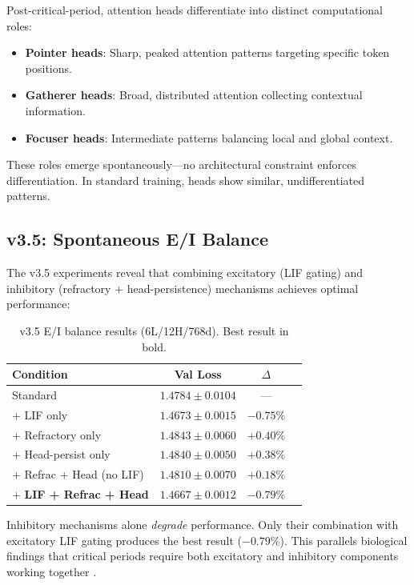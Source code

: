 \documentclass[11pt]{article}
\begin{document}
Post-critical-period, attention heads differentiate into distinct computational roles:
\begin{itemize}
    \item \textbf{Pointer heads}: Sharp, peaked attention patterns targeting specific token positions.
    \item \textbf{Gatherer heads}: Broad, distributed attention collecting contextual information.
    \item \textbf{Focuser heads}: Intermediate patterns balancing local and global context.
\end{itemize}

These roles emerge spontaneously---no architectural constraint enforces differentiation. In standard training, heads show similar, undifferentiated patterns.

\subsection{v3.5: Spontaneous E/I Balance}
\label{sec:ei-balance}

The v3.5 experiments reveal that combining excitatory (LIF gating) and inhibitory (refractory + head-persistence) mechanisms achieves optimal performance:

\begin{table}[h]
\centering
\caption{v3.5 E/I balance results (6L/12H/768d). Best result in bold.}
\label{tab:ei-balance}
\begin{tabular}{lccc}
\toprule
\textbf{Condition} & \textbf{Val Loss} & \textbf{$\Delta$} \\
\midrule
Standard & $1.4784 \pm 0.0104$ & --- \\
+ LIF only & $1.4673 \pm 0.0015$ & $-0.75\%$ \\
+ Refractory only & $1.4843 \pm 0.0060$ & $+0.40\%$ \\
+ Head-persist only & $1.4840 \pm 0.0050$ & $+0.38\%$ \\
+ Refrac + Head (no LIF) & $1.4810 \pm 0.0070$ & $+0.18\%$ \\
+ \textbf{LIF + Refrac + Head} & $\mathbf{1.4667 \pm 0.0012}$ & $\mathbf{-0.79\%}$ \\
\bottomrule
\end{tabular}
\end{table}

Inhibitory mechanisms alone \emph{degrade} performance. Only their combination with excitatory LIF gating produces the best result ($-0.79\%$). This parallels biological findings that critical periods require both excitatory and inhibitory components working together \cite{hensch2005critical}.
\end{document}
